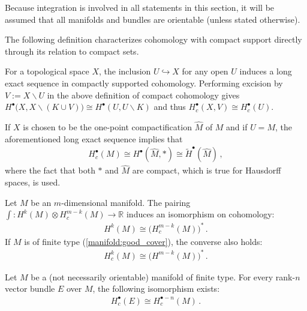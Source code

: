     Because integration is involved in all statements in this section, it will be assumed that all manifolds and bundles are orientable (unless stated otherwise).

    The following definition characterizes cohomology with compact support directly through its relation to compact sets.
    \begin{property}\label{bundle:reduced_compact_cohomology}
        For a topological space $X$, the inclusion $U\hookrightarrow X$ for any open $U$ induces a long exact sequence in compactly supported cohomology. Performing excision by $V:=X\backslash U$ in the above definition of compact cohomology gives $H^\bullet\bigl(X,X\backslash (K\cup V)\bigr)\cong H^\bullet(U,U\backslash K)$ and thus $H^\bullet_c(X,V)\cong H^\bullet_c(U)$.

        If $X$ is chosen to be the one-point compactification $\widehat{M}$ of $M$ and if $U=M$, the aforementioned long exact sequence implies that
        \begin{gather}
            H^\bullet_c(M)\cong H^\bullet(\widehat{M}, \ast)\cong\widetilde{H}^\bullet(\widehat{M})\,,
        \end{gather}
        where the fact that both $\ast$ and $\widehat{M}$ are compact, which is true for Hausdorff spaces, is used.
    \end{property}

    \begin{theorem}\label{bundle:poincare_duality}
        Let $M$ be an $m$-dimensional manifold. The pairing $\int:H^k(M)\otimes H^{m-k}_c(M)\rightarrow\mathbb{R}$ induces an isomorphism on cohomology:
        \begin{gather}
            H^k(M)\cong\bigl(H^{m-k}_c(M)\bigr)^*\,.
        \end{gather}
        If $M$ is of finite type (\cref{manifold:good_cover}), the converse also holds:
        \begin{gather}
            H^k_c(M)\cong\bigl(H^{m-k}(M)\bigr)^*\,.
        \end{gather}
    \end{theorem}
    \begin{result}
        Let $M$ be a (not necessarily orientable) manifold of finite type. For every rank-$n$ vector bundle $E$ over $M$, the following isomorphism exists:
        \begin{gather}
            H^\bullet_c(E)\cong H^{\bullet-n}_c(M)\,.
        \end{gather}
    \end{result}

